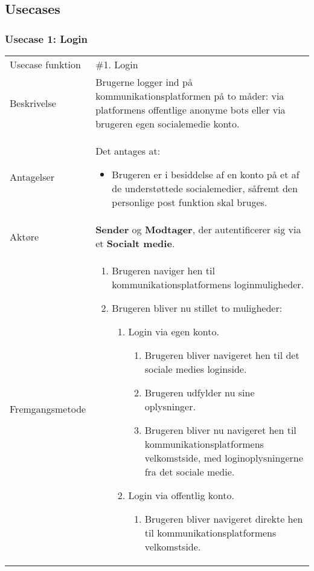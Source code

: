 \subsection{Usecases}
\subsubsection{Usecase 1: Login \label{Usecase1_Login}}
\begin{tabular}{@{}p{3.5cm}@{}p{13cm}@{}}
    Usecase funktion & 
    \#1. Login \\
    Beskrivelse & 
    Brugerne logger ind på kommunikationsplatformen på to måder: via platformens offentlige anonyme bots eller via brugeren egen socialemedie konto.\\
    Antagelser & 
    Det antages at:
    \begin{itemize}
        \item Brugeren er i besiddelse af en konto på et af de understøttede socialemedier, såfremt den personlige post funktion skal bruges.
    \end{itemize} \\
    Aktøre & 
    \textbf{Sender} og \textbf{Modtager}, der autentificerer sig via et \textbf{Socialt medie}.\\
    Fremgangsmetode &
    \begin{enumerate}
        \item Brugeren naviger hen til kommunikationsplatformens loginmuligheder.
        \item Brugeren bliver nu stillet to muligheder:
        \begin{enumerate}
            \item Login via egen konto.
            \begin{enumerate}
                \item Brugeren bliver navigeret hen til det sociale medies loginside.
                \item Brugeren udfylder nu sine oplysninger.
                \item Brugeren bliver nu navigeret hen til kommunikationsplatformens velkomstside, med loginoplysningerne fra det sociale medie.
            \end{enumerate}
            \item Login via offentlig konto.
                \begin{enumerate}
                    \item Brugeren bliver navigeret direkte hen til kommunikationsplatformens velkomstside.

\end{enumerate}
\end{enumerate}
\end{enumerate}
\end{tabular}
